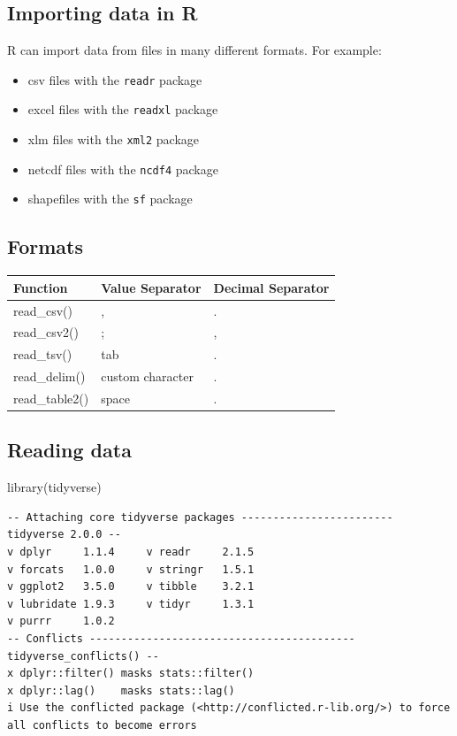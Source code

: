 \documentclass[
  letterpaper,
  DIV=11,
  numbers=noendperiod,
  oneside]{scrartcl}
\newenvironment{Shaded}{\begin{snugshade}}{\end{snugshade}}
\newcommand{\FunctionTok}[1]{\textcolor[rgb]{0.28,0.35,0.67}{#1}}
\newcommand{\NormalTok}[1]{\textcolor[rgb]{0.00,0.23,0.31}{#1}}
\providecommand{\tightlist}{%
  \setlength{\itemsep}{0pt}\setlength{\parskip}{0pt}}\usepackage{longtable,booktabs,array}
\begin{document}
\subsection{Importing data in R}\label{importing-data-in-r}

R can import data from files in many different formats. For example:

\begin{itemize}
\tightlist
\item
  csv files with the \texttt{readr} package
\item
  excel files with the \texttt{readxl} package
\item
  xlm files with the \texttt{xml2} package
\item
  netcdf files with the \texttt{ncdf4} package
\item
  shapefiles with the \texttt{sf} package
\end{itemize}

\subsection{Formats}\label{formats}

\begin{longtable}[]{@{}lll@{}}
\toprule\noalign{}
Function & Value Separator & Decimal Separator \\
\midrule\noalign{}
\endhead
\bottomrule\noalign{}
\endlastfoot
read\_csv() & , & . \\
read\_csv2() & ; & , \\
read\_tsv() & tab & . \\
read\_delim() & custom character & . \\
read\_table2() & space & . \\
\end{longtable}

\subsection{Reading data}\label{reading-data}

\begin{Shaded}
\begin{Highlighting}[numbers=left,,]
\FunctionTok{library}\NormalTok{(tidyverse)}
\end{Highlighting}
\end{Shaded}

\begin{verbatim}
-- Attaching core tidyverse packages ------------------------ tidyverse 2.0.0 --
v dplyr     1.1.4     v readr     2.1.5
v forcats   1.0.0     v stringr   1.5.1
v ggplot2   3.5.0     v tibble    3.2.1
v lubridate 1.9.3     v tidyr     1.3.1
v purrr     1.0.2     
-- Conflicts ------------------------------------------ tidyverse_conflicts() --
x dplyr::filter() masks stats::filter()
x dplyr::lag()    masks stats::lag()
i Use the conflicted package (<http://conflicted.r-lib.org/>) to force all conflicts to become errors
\end{verbatim}
\end{document}
